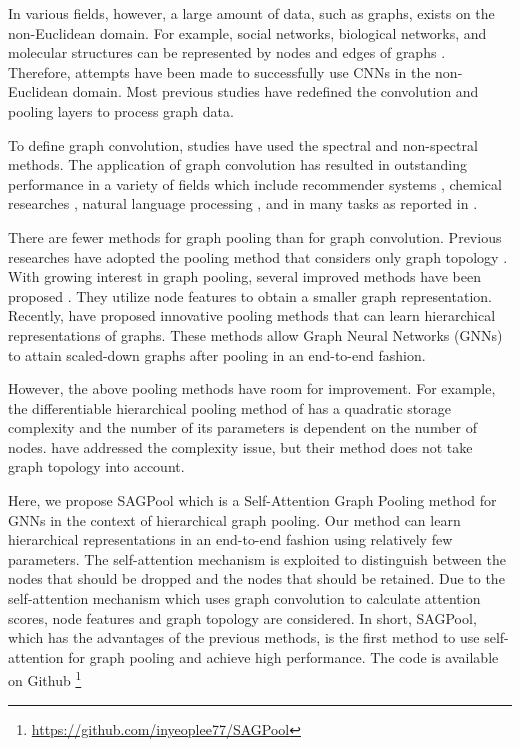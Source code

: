 \documentclass{article}
\begin{document}
In various fields, however, a large amount of data, such as graphs, exists on the non-Euclidean domain. For example, social networks, biological networks, and molecular structures can be represented by nodes and edges of graphs \cite{lazer2009life,davidson2002genomic,duvenaud2015convolutional}. Therefore, attempts have been made to successfully use CNNs in the non-Euclidean domain. Most previous studies have redefined the convolution and pooling layers to process graph data.

To define graph convolution, studies have used the spectral \cite{bruna2014spectral,henaff2015deep,defferrard2016convolutional,kipf2016semi} and non-spectral  \cite{monti2017geometric,hamilton2017inductive,Xu2018RepresentationLO,veličković2018graph,DBLP:journals/corr/abs-1810-02244} methods. The application of graph convolution has resulted in outstanding performance in a variety of fields which include recommender systems \cite{van2017graph, yao2018convolutional,monti2017geometric}, chemical researches \cite{NIPS2018_7877, Zitnik2018}, natural language processing \cite{bastings2017graph, peng2018large, yao2018graph}, and in many tasks as reported in \citeauthor{zhou2018graph}.


There are fewer methods for graph pooling than for graph convolution. Previous researches have adopted the pooling method that considers only graph topology \cite{defferrard2016convolutional, ijcai2018-490}. With growing interest in graph pooling, several improved methods have been proposed \cite{dai2016discriminative, duvenaud2015convolutional,gilmer2017neural,zhang2018end}. They utilize node features to obtain a smaller graph representation. Recently, \citeauthor{RexYing,gao2019graph,cangea2018towards} have proposed innovative pooling methods that can learn hierarchical representations of graphs. These methods allow Graph Neural Networks (GNNs) to attain scaled-down graphs after pooling in an end-to-end fashion.

However, the above pooling methods have room for improvement. For example, the differentiable hierarchical pooling method of \citeauthor{RexYing} has a quadratic storage complexity and the number of its parameters is dependent on the number of nodes. \citeauthor{gao2019graph,cangea2018towards} have addressed the complexity issue, but their method does not take graph topology into account.

Here, we propose SAGPool which is a Self-Attention Graph Pooling method for GNNs in the context of hierarchical graph pooling. Our method can learn hierarchical representations in an end-to-end fashion using relatively few parameters. The self-attention mechanism is exploited to distinguish between the nodes that should be dropped and the nodes that should be retained. 
Due to the self-attention mechanism which uses graph convolution to calculate attention scores, node features and graph topology are considered.
In short, SAGPool, which has the advantages of the previous methods, is the first method to use self-attention for graph pooling and achieve high performance.
The code is available on Github \footnote{\url{https://github.com/inyeoplee77/SAGPool}} 
\end{document}
